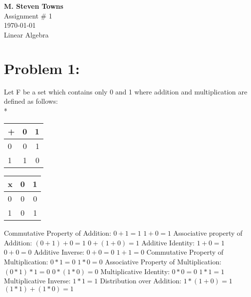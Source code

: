 \documentclass{report}
\begin{document}
\begin{center}
\textbf{M. Steven Towns}\\
Assignment \# 1\\
\today\\
Linear Algebra\\

\end{center}
\hrulefill
\section*{Problem 1:}
Let F be a set which contains only 0 and 1 where addition and multiplication are defined as follows:
\\*
\begin{center}
	\begin{tabular}{|l||c|r|}
		\hline
		+&0&1\\
		\hline
		\hline
		0&0&1\\
		1&1&0\\
		\hline
	\end{tabular}
	\begin{tabular}{|l||c|r|}
		\hline
		x&0&1\\
		\hline
		\hline
		0&0&0\\
		1&0&1\\
		\hline
	\end{tabular}
\end{center}

Commutative Property of Addition:\newline
$0+1=1$\newline
$1+0=1$\newline
Associative property of Addition:\newline
$(0+1)+0=1$\newline
$0+(1+0)=1$\newline
Additive Identity:\newline
$1+0=1$\newline
$0+0=0$\newline
Additive Inverse:\newline
$0+0=0$\newline
$1+1=0$\newline
Commutative Property of Multiplication:\newline
$0*1=0$\newline
$1*0=0$\newline
Associative Property of Multiplication:\newline
$(0*1)*1=0$\newline
$0*(1*0)=0$\newline
Multiplicative Identity:\newline
$0*0=0$\newline
$1*1=1$\newline
Multiplicative Inverse:\newline
$1*1=1$\newline
Distribution over Addition:\newline
$1*(1+0)=1$\newline
$(1*1)+(1*0)=1$
\end{document}
